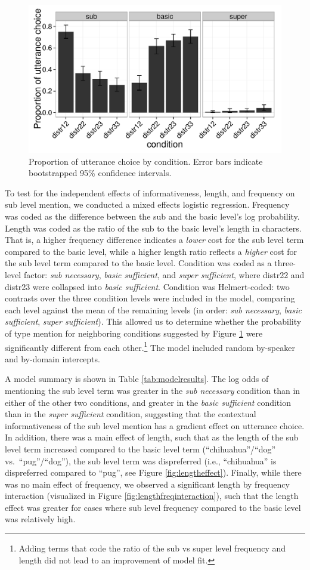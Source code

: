 \documentclass[10pt,letterpaper]{article}
\newcommand{\tableref}[1]{Table \ref{#1}}
\newcommand{\figref}[1]{Figure \ref{#1}}
\begin{document}
\begin{figure}[ht!]
\centering
\includegraphics[width=.5\textwidth]{graphs/results-collapsed}
\caption{Proportion of utterance choice by condition. Error bars indicate bootstrapped 95\% confidence intervals.}
\label{fig:results1}
\end{figure}

To test for the independent effects of informativeness, length, and frequency on sub level mention, we conducted a mixed effects logistic regression. Frequency was coded as the difference between the sub and the basic level's log probability. Length was coded as the ratio of the sub to the basic level's length in characters. That is, a higher frequency difference indicates a \emph{lower} cost for the sub level term compared to the basic level, while a higher length ratio reflects a \emph{higher} cost for the sub level term compared to the basic level. Condition was coded as a three-level factor: \emph{sub necessary}, \emph{basic sufficient}, and \emph{super sufficient}, where distr22 and distr23 were collapsed into \emph{basic sufficient}. Condition was Helmert-coded: two contrasts over the three condition levels were included in the model, comparing each level against the mean of the remaining levels (in order: \emph{sub necessary}, \emph{basic sufficient}, \emph{super sufficient}). This allowed us to determine whether the probability of type mention  for neighboring conditions suggested by \figref{fig:results1} were significantly different from each other.\footnote{Adding terms that code the ratio of the sub vs super level frequency and length did not lead to an improvement of model fit.} The model included random by-speaker and by-domain intercepts. 



A model summary is shown in \tableref{tab:modelresults}. The log odds of mentioning the sub level term was greater in the \emph{sub necessary} condition than in either of the other two conditions, and greater in the \emph{basic sufficient} condition than in the \emph{super sufficient} condition, suggesting that the contextual informativeness of the sub level mention has a gradient effect on utterance choice. In addition, there was a main effect of length, such that as the length of the sub level term increased compared to the basic level term (``chihuahua''/``dog'' vs.~``pug''/``dog''), the sub level term was dispreferred (i.e., ``chihuahua'' is dispreferred compared to ``pug'', see \figref{fig:lengtheffect}). Finally, while there was no main effect of frequency, we observed a significant length by frequency interaction (visualized in \figref{fig:lengthfreqinteraction}), such that the length effect was greater for cases where sub level frequency compared to the basic level was relatively high. 
\end{document}

